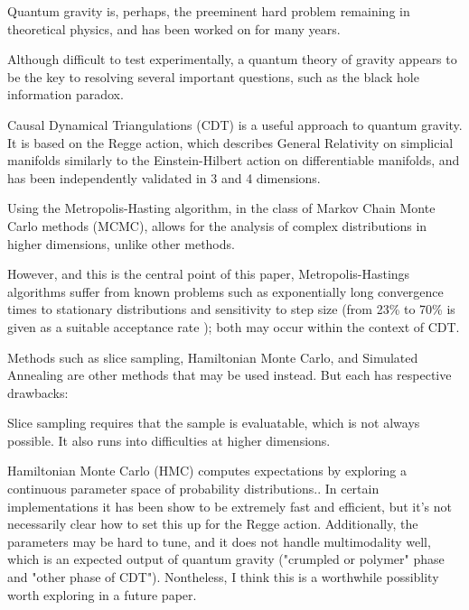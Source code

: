 \documentclass[12pt]{article}
\begin{document}
Quantum gravity is, perhaps, the preeminent hard problem\cite{steve_carlip_why_2014} remaining in theoretical physics, and has been worked on for many years\cite{rovelli_notes_2000}.

Although difficult to test experimentally, a quantum theory of gravity appears to be the key to resolving several important
questions, such as the black hole information paradox.\cite{preskill_black_1992}

Causal Dynamical Triangulations (CDT) \cite{ambjorn_non-perturbative_2000,j._ambjorn_dynamically_2001,loll_discrete_2003,ambjorn_quantum_2013,cooperman_making_2014} is a useful
approach to quantum gravity. It is based on the Regge action\cite{regge_general_1961}, which describes General Relativity on simplicial manifolds similarly to the Einstein-Hilbert
action on differentiable manifolds, and has been independently validated in 3 and 4 dimensions.\cite{kommu_validation_2011}

Using the Metropolis-Hasting algorithm\cite{robert_metropolis-hastings_2015}, in the class of Markov Chain Monte Carlo methods (MCMC), allows
for the analysis of complex distributions in higher dimensions, unlike other methods.\cite{grisins_metropolishastings_2014}

However, and this is the central point of this paper, Metropolis-Hastings algorithms suffer from known problems such as exponentially long convergence times to stationary distributions and sensitivity to step size (from 23\% to 70\% is given as a suitable acceptance rate \cite{bedard_optimal_2008,xing_markov_nodate}); both may occur within the context of CDT.

Methods such as slice sampling, Hamiltonian Monte Carlo, and Simulated Annealing are other methods that may be used instead.
But each has respective drawbacks:

Slice sampling \cite{neal_slice_2003} requires that the sample is evaluatable, which is not always possible. It also runs into difficulties at higher dimensions.

Hamiltonian Monte Carlo (HMC) computes expectations by exploring a continuous parameter space of probability distributions.\cite{betancourt_conceptual_2017}. In certain implementations
it has been show to be extremely fast and efficient\cite{hoffman_no-u-turn_2011}, but it's not necessarily clear how to set this up for the Regge action. Additionally, the parameters may be hard to tune, and it does not handle multimodality well, which is an expected output of quantum gravity ("crumpled or polymer" phase and "other phase of CDT"). Nontheless, I think this is a worthwhile possiblity worth exploring in a future paper.
\end{document}

